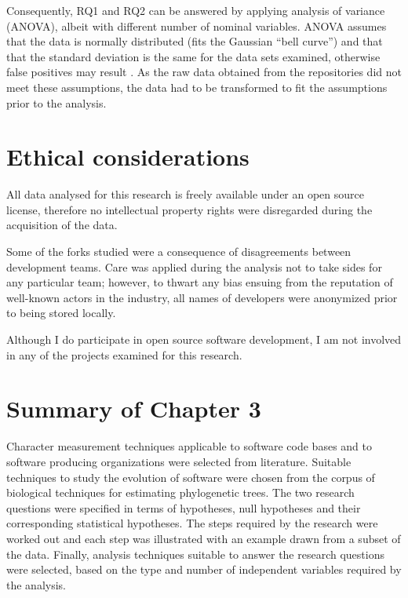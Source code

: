 Consequently, RQ1 and RQ2 can be answered by applying analysis of variance (ANOVA), albeit with different number of nominal variables. ANOVA assumes that the data is normally distributed (fits the Gaussian “bell curve”) and that that the standard deviation is the same for the data sets examined, otherwise false positives may result \citep[p.147]{McDonald2014b}. As the raw data obtained from the repositories did not meet these assumptions, the data had to be transformed to fit the assumptions prior to the analysis.

\section{Ethical considerations}
All data analysed for this research is freely available under an open source license, therefore no intellectual property rights were disregarded during the acquisition of the data. 

Some of the forks studied were a consequence of disagreements between development teams. Care was applied during the analysis not to take sides for any particular team; however, to thwart any bias ensuing from the reputation of well-known actors in the industry, all names of developers were anonymized prior to being stored locally.

Although I do participate in open source software development, I am not involved in any of the projects examined for this research.
\section{Summary of Chapter 3}
Character measurement techniques applicable to software code bases and to software producing organizations were selected from literature. Suitable techniques to study the evolution of software were chosen from the corpus of biological techniques for estimating phylogenetic trees. The two research questions were specified in terms of hypotheses, null hypotheses and their corresponding statistical hypotheses. The steps required by the research were worked out and each step was illustrated with an example drawn from a subset of the data. Finally, analysis techniques suitable to answer the research questions were selected, based on the type and number of independent variables required by the analysis.


